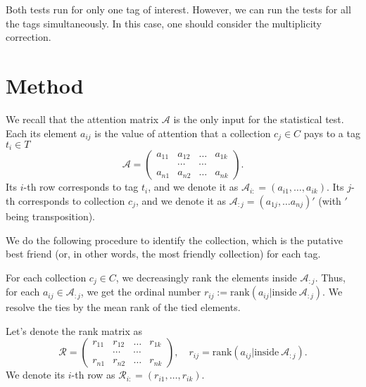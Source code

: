 \documentclass{llncs}
\begin{document}
Both tests run for only one tag of interest. However, we can run the tests for all the tags simultaneously. In this case, one should consider the multiplicity correction. 

\section{Method}
\label{sec:method}


We recall that the attention matrix $\mathcal{A}$ is the only input for the statistical test. Each its element $a_{ij}$ is the value of attention that a collection $c_j \in C$ pays to a tag $t_i \in T$
\[
\mathcal{A} = \begin{pmatrix}
a_{11} & a_{12} & \dots & a_{1k} \\
       &\cdots & \cdots &  \\
a_{n1} & a_{n2} & \dots & a_{nk}
\end{pmatrix}.
\]
Its $i$-th row corresponds to tag $t_i$, and we denote it as $\mathcal{A}_{i:} = (a_{i1}, \dots, a_{ik})$. Its $j$-th  corresponds to collection $c_j$, and we denote it as $\mathcal{A}_{:j} =(a_{1j}, \dots a_{nj})'$ (with $'$ being transposition).


We do the following procedure to identify the collection, which is the putative best friend (or, in other words, the most friendly collection) for each tag.

For each collection $c_j \in C$, we decreasingly rank the elements inside $\mathcal{A}_{:j}$. Thus, for each $a_{ij} \in \mathcal{A}_{:j}$, we get the ordinal number $r_{ij}:=\text{rank}\left(a_{ij}|\text{inside}~\mathcal{A}_{:j}\right)$. We resolve the ties by the mean rank of the tied elements. 

Let's denote the rank matrix as 
\begin{equation}
\label{def:R}
\mathcal{R} = \begin{pmatrix}
r_{11} & r_{12} & \dots & r_{1k} \\
       &\cdots & \cdots &  \\
r_{n1} & r_{n2} & \dots & r_{nk}
\end{pmatrix}, 
\quad
r_{ij} =\text{rank}\left(a_{ij}|\text{inside}~\mathcal{A}_{:j}\right).
\end{equation}
We denote its $i$-th row as $\mathcal{R}_{i:} = (r_{i1}, \dots, r_{ik})$.
\end{document}
